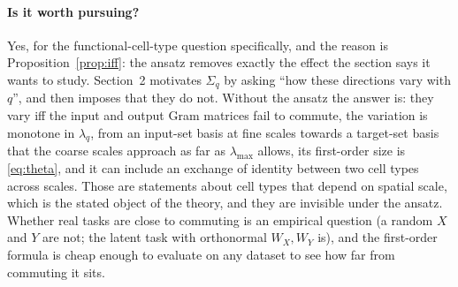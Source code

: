 \documentclass[11pt,a4paper]{article}
\begin{document}
\paragraph{Is it worth pursuing?}
Yes, for the functional-cell-type question specifically, and the reason is Proposition~\ref{prop:iff}: the ansatz removes exactly the effect the section says it wants to study. Section~2 motivates $\Sigma_q$ by asking ``how these directions vary with $q$'', and then imposes that they do not. Without the ansatz the answer is: they vary iff the input and output Gram matrices fail to commute, the variation is monotone in $\lambda_q$, from an input-set basis at fine scales towards a target-set basis that the coarse scales approach as far as $\lambda_{\max}$ allows, its first-order size is \eqref{eq:theta}, and it can include an exchange of identity between two cell types across scales. Those are statements about cell types that depend on spatial scale, which is the stated object of the theory, and they are invisible under the ansatz. Whether real tasks are close to commuting is an empirical question (a random $X$ and $Y$ are not; the latent task with orthonormal $W_X, W_Y$ is), and the first-order formula is cheap enough to evaluate on any dataset to see how far from commuting it sits.
\end{document}
